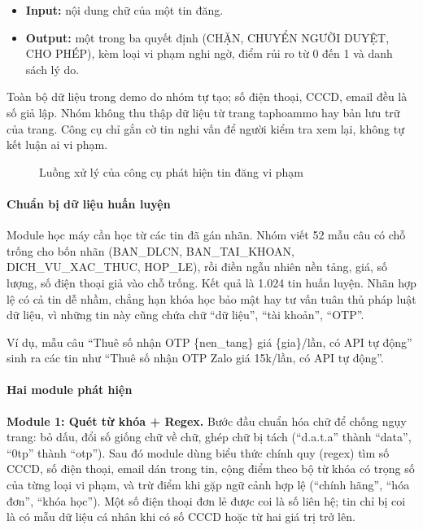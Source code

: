 \begin{itemize}
\item \textbf{Input:} nội dung chữ của một tin đăng.
\item \textbf{Output:} một trong ba quyết định (CHẶN, CHUYỂN NGƯỜI DUYỆT, CHO PHÉP), kèm loại vi phạm nghi ngờ, điểm rủi ro từ 0 đến 1 và danh sách lý do.
\end{itemize}
Toàn bộ dữ liệu trong demo do nhóm tự tạo; số điện thoại, CCCD, email đều là số giả lập. Nhóm không thu thập dữ liệu từ trang taphoammo hay bản lưu trữ của trang. Công cụ chỉ gắn cờ tin nghi vấn để người kiểm tra xem lại, không tự kết luận ai vi phạm.

\begin{figure}[H]
\centering

\caption{Luồng xử lý của công cụ phát hiện tin đăng vi phạm}
\label{fig:5.1}
\end{figure}

\paragraph{Chuẩn bị dữ liệu huấn luyện}

Module học máy cần học từ các tin đã gán nhãn. Nhóm viết 52 mẫu câu có chỗ trống cho bốn nhãn (BAN\_\allowbreak{}DLCN, BAN\_\allowbreak{}TAI\_\allowbreak{}KHOAN, DICH\_\allowbreak{}VU\_\allowbreak{}XAC\_\allowbreak{}THUC, HOP\_\allowbreak{}LE), rồi điền ngẫu nhiên nền tảng, giá, số lượng, số điện thoại giả vào chỗ trống. Kết quả là 1.024 tin huấn luyện. Nhãn hợp lệ có cả tin dễ nhầm, chẳng hạn khóa học bảo mật hay tư vấn tuân thủ pháp luật dữ liệu, vì những tin này cũng chứa chữ “dữ liệu”, “tài khoản”, “OTP”.

Ví dụ, mẫu câu “Thuê số nhận OTP \{nen\_\allowbreak{}tang\} giá \{gia\}/lần, có API tự động” sinh ra các tin như “Thuê số nhận OTP Zalo giá 15k/lần, có API tự động”.

\paragraph{Hai module phát hiện}

\textbf{Module 1: Quét từ khóa + Regex.} Bước đầu chuẩn hóa chữ để chống ngụy trang: bỏ dấu, đổi số giống chữ về chữ, ghép chữ bị tách (“d.a.t.a” thành “data”, “0tp” thành “otp”). Sau đó module dùng biểu thức chính quy (regex) tìm số CCCD, số điện thoại, email dán trong tin, cộng điểm theo bộ từ khóa có trọng số của từng loại vi phạm, và trừ điểm khi gặp ngữ cảnh hợp lệ (“chính hãng”, “hóa đơn”, “khóa học”). Một số điện thoại đơn lẻ được coi là số liên hệ; tin chỉ bị coi là có mẫu dữ liệu cá nhân khi có số CCCD hoặc từ hai giá trị trở lên.

